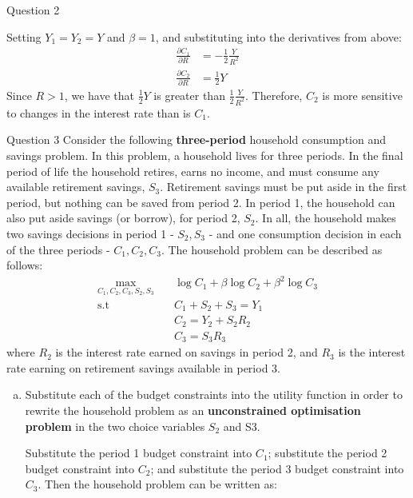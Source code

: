 \documentclass[a4paper]{article}
\begin{document}
\begin{questionbox}{Question 2}
\begin{enumerate}[(a)]
			\begin{explanationbox}
				Setting \( Y_1 = Y_2 = Y \) and \( \beta = 1 \), and substituting into the derivatives from above:
				\begin{align*}
					\frac{\partial C_1}{\partial R} &= -\frac{1}{2}\frac{Y}{R^2}\\
					\frac{\partial C_2}{\partial R} &= \frac{1}{2} Y
				\end{align*}
				Since \( R > 1 \), we have that \( \frac{1}{2}Y \) is greater than \( \frac{1}{2}\frac{Y}{R^2} \). Therefore, \( C_2 \) is more sensitive to changes in the interest rate than is \( C_1 \).
			\end{explanationbox}
		\end{enumerate}
	\end{questionbox}\pagebreak
	\begin{questionbox}{Question 3}
		Consider the following \textbf{three-period} household consumption and savings problem. In this problem, a household lives for three periods. In the final period of life the household retires, earns no income, and must consume any available retirement savings, \( S_3 \). Retirement savings must be put aside in the first period, but nothing can be saved from period 2. In period 1, the household can also put aside savings (or borrow), for period 2, \( S_2 \). In all, the household makes two savings decisions in period 1 - \( S_2,S_3 \) - and one consumption decision in each of the three periods - \( C_1,C_2,C_3 \). The household problem can be described as follows:
		\begin{align*}
			\max_{C_1,C_2,C_3,S_2,S_3} \quad &\log C_1 + \beta\log C_2 + \beta^2\log C_3\\
			\text{s.t} \quad & C_1 + S_2 + S_3 = Y_1\\
			&C_2 = Y_2 + S_2R_2\\
			&C_3 = S_3 R_3
		\end{align*}
		where \( R_2 \) is the interest rate earned on savings in period 2, and \( R_3 \) is the interest rate earning on retirement savings available in period 3.
		\begin{enumerate}[(a)]
			\item Substitute each of the budget constraints into the utility function in order to rewrite the household problem as an \textbf{unconstrained optimisation problem} in the two choice variables \( S_2 \) and S3.
			\begin{explanationbox}
				Substitute the period 1 budget constraint into \( C_1 \); substitute the period 2 budget constraint into \( C_2 \); and substitute the period 3 budget constraint into \( C_3 \). Then the household problem can be written as:

\end{explanationbox}
\end{enumerate}
\end{questionbox}
\end{document}
